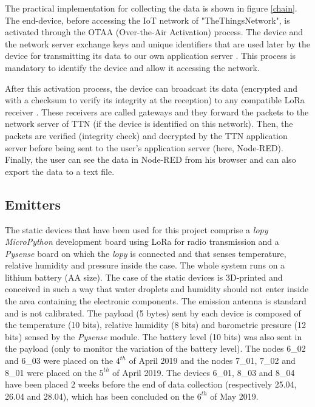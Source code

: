 \documentclass[letterpaper, 10 pt, conference]{ieeeconf}  %
\begin{document}
The practical implementation for collecting the data is shown in figure \ref{chain}. The end-device, before accessing the IoT network of "TheThingsNetwork", is activated through the  OTAA (Over-the-Air Activation) process. The device and the network server exchange keys and unique identifiers that are used later by the device for transmitting its data to our own application server \cite{c6}. This process is mandatory to identify the device and allow it accessing the network.

After this activation process, the device can broadcast its data (encrypted and with a checksum to verify its integrity at the reception) to any compatible LoRa receiver . These receivers are called gateways and they forward the packets to the network server of TTN (if the device is identified on this network). Then, the packets are verified (integrity check) and decrypted by the TTN application server before being sent to the user's application server (here, Node-RED). Finally, the user can see the data in Node-RED from his browser and can also export the data to a text file.

\subsection{Emitters}

The static devices that have been used for this project comprise a \textit {lopy MicroPython} development board using LoRa for radio transmission and a \textit{Pysense} board on which the \textit{lopy} is connected and that senses temperature, relative humidity and pressure inside the case. The whole system runs on a lithium battery (AA size). The case of the static devices is 3D-printed and conceived in such a way that water droplets and humidity should not enter inside the area containing the electronic components. The emission antenna is standard and is not calibrated. The payload (5 bytes) sent by each device is composed of the temperature (10 bits), relative humidity (8 bits) and barometric pressure (12 bits) sensed by the \textit{Pysense} module. The battery level (10 bits) was also sent in the payload (only to monitor the variation of the battery level). The nodes 6\_02 and 6\_03 were placed on the $4^{th}$ of April 2019 and the nodes 7\_01, 7\_02 and 8\_01 were placed on the $5^{th}$ of April 2019. The devices 6\_01, 8\_03 and 8\_04 have been placed 2 weeks before the end of data collection (respectively 25.04, 26.04 and 28.04), which has been concluded on the $6^{th}$ of May 2019.
\end{document}
